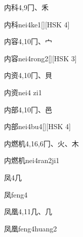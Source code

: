 \begin{Entry}{内科}{4,9}{⼌、⽲}
  \begin{Phonetics}{内科}{nei4ke1}[][HSK 4]
  \end{Phonetics}
\end{Entry}

\begin{Entry}{内容}{4,10}{⼌、⼧}
  \begin{Phonetics}{内容}{nei4rong2}[][HSK 3]
  \end{Phonetics}
\end{Entry}

\begin{Entry}{内资}{4,10}{⼌、⾙}
  \begin{Phonetics}{内资}{nei4 zi1}
  \end{Phonetics}
\end{Entry}

\begin{Entry}{内部}{4,10}{⼌、⾢}
  \begin{Phonetics}{内部}{nei4bu4}[][HSK 4]
  \end{Phonetics}
\end{Entry}

\begin{Entry}{内燃机}{4,16,6}{⼌、⽕、⽊}
  \begin{Phonetics}{内燃机}{nei4ran2ji1}
  \end{Phonetics}
\end{Entry}

\begin{Entry}{凤}{4}{⼏}
  \begin{Phonetics}{凤}{feng4}
  \end{Phonetics}
\end{Entry}

\begin{Entry}{凤凰}{4,11}{⼏、⼏}
  \begin{Phonetics}{凤凰}{feng4huang2}
  \end{Phonetics}
\end{Entry}

